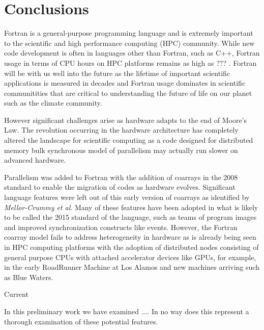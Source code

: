 \section{Conclusions}

Fortran is a general-purpose programming language and is extremely important to the
scientific and high performance computing (HPC) community.  While new code development is
often in languages other than Fortran, such as C++, Fortran usage in terms of CPU hours on
HPC platforms remains as high as ??? \cite{Yellick::language:breakdown}.  Fortran will be
with us well into the future as the lifetime of important scientific applications is
measured in decades and Fortran usage dominates in scientific communitities that are
critical to understanding the future of life on our planet such as the climate community.

However significant challenges arise as hardware adapts to the end of Moore's
Law\cite{exascale:workshop:2011}.  The revolution occurring in the hardware architecture
has completely altered the landscape for scientific computing as a code designed for
distributed memory bulk synchronous model of parallelism may actually run slower on
advanced hardware\cite{Dubey:2014:SSC:2686745.2686756}.

Parallelism was added to Fortran with the addition of coarrays in the 2008
standard\cite{fortran:2008} to enable the migration of codes as hardware evolves.
Significant language features were left out of this early version of coarrays as
identified by \emph{Mellor-Crummy et al}\cite{mellor-crummey:2009:caf2}.  Many of these features
have been adopted in what is likely to be called the 2015 standard of the language\cite{fortran:2015},
such as teams of program images and improved synchronization constructs like events.
However, the Fortran coarray model fails to address heterogeneity in hardware as is already
being seen in HPC computing platforms with the adoption of distributed nodes consisting of
general purpose CPUs with attached accelerator devices like GPUs, for example, in the early
RoadRunner Machine at Los Alamos\cite{RoadRunner} and new machines arriving such as Blue
Waters\cite{blue:waters}.

Current


In this preliminary work we have examined ....
In no way does this represent a thorough examination of these potential features.

